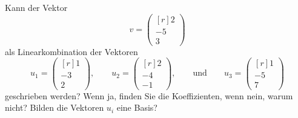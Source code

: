 Kann der Vektor
\[
v = \begin{pmatrix*}[r]
2\\-5\\3
\end{pmatrix*}
\]
als Linearkombination der Vektoren
\[
u_1=\begin{pmatrix*}[r]
1\\-3\\2
\end{pmatrix*},
\qquad
u_2=\begin{pmatrix*}[r]
2\\-4\\-1
\end{pmatrix*},
\qquad\text{und}\qquad
u_3=\begin{pmatrix*}[r]
1\\-5\\7
\end{pmatrix*}
\]
geschrieben werden? Wenn ja, finden Sie die Koeffizienten, wenn nein,
warum nicht? Bilden die Vektoren $u_i$ eine Basis?

\begin{hinweis}
\end{hinweis}


